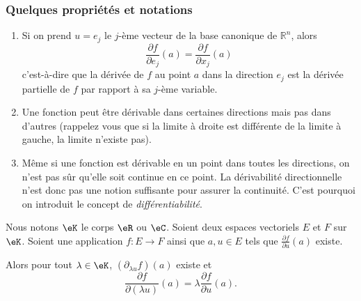 \subsubsection{Quelques propriétés et notations}

\begin{enumerate}
	\item Si on prend \( u=e_j\) le \( j\)-ème vecteur de la base canonique de
	      \( \mathbb{R}^n\), alors
	      \begin{equation}
		      \frac{\partial f}{\partial e_j}(a) = \frac{\partial f}{\partial
			      x_j}(a)
	      \end{equation}
	      c'est-à-dire que la dérivée de \( f\) au point \( a\) dans la
	      direction \( e_j\) est la dérivée partielle de \( f\) par rapport à sa
	      \( j\)-ème variable.

	\item
	      Une fonction peut être dérivable dans certaines directions
	      mais pas dans d'autres (rappelez vous que si la limite à droite est
	      différente de la limite à gauche, la limite n'existe pas).

	\item
	      Même si une fonction est dérivable en un point dans toutes les
	      directions, on n'est pas sûr qu'elle soit continue en ce point. La
	      dérivabilité directionnelle n'est donc pas une notion suffisante
	      pour assurer la continuité. C'est pourquoi on introduit le concept
	      de \emph{différentiabilité}.
\end{enumerate}

\begin{lemma}       \label{LEMooVOTHooPJcrWH}
	Nous notons \( \eK\) le corps \( \eR\) ou \( \eC\). Soient deux espaces vectoriels \( E\) et \( F\) sur \( \eK\). Soient une application \( f\colon E\to F\) ainsi que \( a,u\in E\) tels que \( \frac{ \partial f }{ \partial u }(a)\) existe.

	Alors pour tout \( \lambda\in \eK\), \( (\partial_{\lambda u}f)(a)\) existe et
	\begin{equation}
		\frac{ \partial f }{ \partial (\lambda u) }(a)=\lambda\frac{ \partial f }{ \partial u }(a).
	\end{equation}
\end{lemma}


